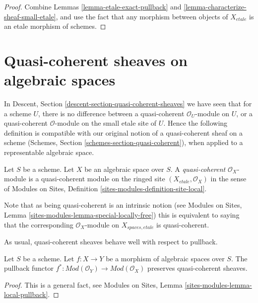 \begin{proof}
Combine Lemmas \ref{lemma-etale-exact-pullback}
and \ref{lemma-characterize-sheaf-small-etale}, and use the fact that
any morphism between objects of $X_{etale}$ is an etale morphism of schemes.
\end{proof}





\section{Quasi-coherent sheaves on algebraic spaces}
\label{section-quasi-coherent}

\noindent
In
Descent, Section \ref{descent-section-quasi-coherent-sheaves}
we have seen that for a scheme $U$, there is no difference between a
quasi-coherent $\mathcal{O}_U$-module on $U$, or a quasi-coherent
$\mathcal{O}$-module on the small etale site of $U$. Hence the following
definition is compatible with our original notion of a quasi-coherent sheaf
on a scheme
(Schemes, Section \ref{schemes-section-quasi-coherent}),
when applied to a representable algebraic space.

\begin{definition}
\label{definition-quasi-coherent}
Let $S$ be a scheme. Let $X$ be an algebraic space over $S$.
A {\it quasi-coherent} $\mathcal{O}_X$-module 
is a quasi-coherent module on the ringed site $(X_{etale}, \mathcal{O}_X)$
in the sense of
Modules on Sites,
Definition \ref{sites-modules-definition-site-local}.
\end{definition}

\noindent
Note that as being quasi-coherent is an intrinsic notion (see
Modules on Sites, Lemma \ref{sites-modules-lemma-special-locally-free})
this is equivalent to saying that the corresponding $\mathcal{O}_X$-module
on $X_{spaces, etale}$ is quasi-coherent.

\medskip\noindent
As usual, quasi-coherent sheaves behave well with respect to pullback.

\begin{lemma}
\label{lemma-pullback-quasi-coherent}
Let $S$ be a scheme.
Let $f : X \to Y$ be a morphism of algebraic spaces over $S$.
The pullback functor
$f^* : \textit{Mod}(\mathcal{O}_Y) \to \textit{Mod}(\mathcal{O}_X)$
preserves quasi-coherent sheaves.
\end{lemma}

\begin{proof}
This is a general fact, see
Modules on Sites, Lemma \ref{sites-modules-lemma-local-pullback}.
\end{proof}

